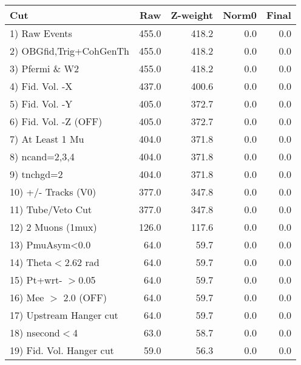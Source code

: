  \begin{table}[h!]\centering
 \begin{tabular}{||l||r|r|r|r||}
 \hline
 \hline
 Cut & Raw & Z-weight & Norm0 & Final \\
 \hline
  1) Raw Events           &       455.0 &       418.2 &         0.0 &         0.0 \\
  2) OBGfid,Trig+CohGenTh &       455.0 &       418.2 &         0.0 &         0.0 \\
  3) Pfermi \& W2         &       455.0 &       418.2 &         0.0 &         0.0 \\
  4) Fid. Vol. -X         &       437.0 &       400.6 &         0.0 &         0.0 \\
  5) Fid. Vol. -Y         &       405.0 &       372.7 &         0.0 &         0.0 \\
  6) Fid. Vol. -Z (OFF)   &       405.0 &       372.7 &         0.0 &         0.0 \\
  7) At Least 1 Mu        &       404.0 &       371.8 &         0.0 &         0.0 \\
  8) ncand=2,3,4          &       404.0 &       371.8 &         0.0 &         0.0 \\
  9) tnchgd=2             &       404.0 &       371.8 &         0.0 &         0.0 \\
 10) +/- Tracks (V0)      &       377.0 &       347.8 &         0.0 &         0.0 \\
 11) Tube/Veto Cut        &       377.0 &       347.8 &         0.0 &         0.0 \\
 12) 2 Muons (1mux)       &       126.0 &       117.6 &         0.0 &         0.0 \\
 13) PmuAsym<0.0          &        64.0 &        59.7 &         0.0 &         0.0 \\
 14) Theta$<$2.62 rad     &        64.0 &        59.7 &         0.0 &         0.0 \\
 15) Pt+wrt- $>$0.05      &        64.0 &        59.7 &         0.0 &         0.0 \\
 16) Mee $>$ 2.0  (OFF)   &        64.0 &        59.7 &         0.0 &         0.0 \\
 17) Upstream Hanger cut  &        64.0 &        59.7 &         0.0 &         0.0 \\
 18) nsecond$<$4          &        63.0 &        58.7 &         0.0 &         0.0 \\
 19) Fid. Vol. Hanger cut &        59.0 &        56.3 &         0.0 &         0.0 \\

\end{tabular}
\end{table}
